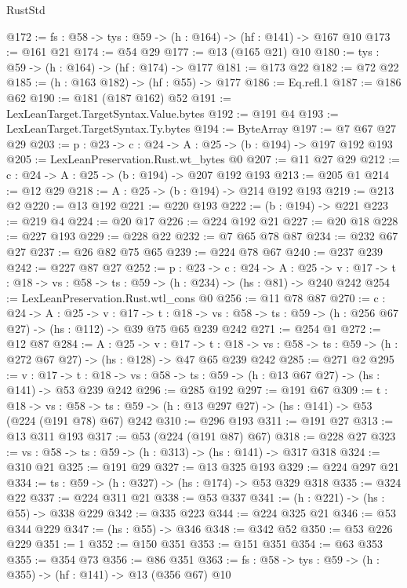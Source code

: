 \begin{lexlean}{RustStd}
\begin{coremodule}
@172 := {fs : @58} -> {tys : @59} -> (h : @164) -> (hf : @141) -> @167 @10
@173 := @161 @21
@174 := @54 @29
@177 := @13 (@165 @21) @10
@180 := {tys : @59} -> (h : @164) -> (hf : @174) -> @177
@181 := @173 @22
@182 := @72 @22
@185 := (h : @163 @182) -> (hf : @55) -> @177
@186 := Eq.refl.{1}
@187 := @186 @62
@190 := @181 (@187 @162) @52
@191 := LexLeanTarget.TargetSyntax.Value.bytes
@192 := @191 @4
@193 := LexLeanTarget.TargetSyntax.Ty.bytes
@194 := ByteArray
@197 := @7 @67 @27 @29
@203 := {p : @23} -> {c : @24} -> {A : @25} -> (b : @194) -> @197 @192 @193
@205 := LexLeanPreservation.Rust.wt_bytes @0
@207 := @11 @27 @29
@212 := {c : @24} -> {A : @25} -> (b : @194) -> @207 @192 @193
@213 := @205 @1
@214 := @12 @29
@218 := {A : @25} -> (b : @194) -> @214 @192 @193
@219 := @213 @2
@220 := @13 @192
@221 := @220 @193
@222 := (b : @194) -> @221
@223 := @219 @4
@224 := @20 @17
@226 := @224 @192 @21
@227 := @20 @18
@228 := @227 @193
@229 := @228 @22
@232 := @7 @65 @78 @87
@234 := @232 @67 @27
@237 := @26 @82 @75 @65
@239 := @224 @78 @67
@240 := @237 @239
@242 := @227 @87 @27
@252 := {p : @23} ->
  {c : @24} ->
  {A : @25} ->
  {v : @17} -> {t : @18} -> {vs : @58} -> {ts : @59} -> (h : @234) -> (hs : @81) -> @240 @242
@254 := LexLeanPreservation.Rust.wtl_cons @0
@256 := @11 @78 @87
@270 := {c : @24} ->
  {A : @25} ->
  {v : @17} ->
  {t : @18} ->
  {vs : @58} -> {ts : @59} -> (h : @256 @67 @27) -> (hs : @112) -> @39 @75 @65 @239 @242
@271 := @254 @1
@272 := @12 @87
@284 := {A : @25} ->
  {v : @17} ->
  {t : @18} -> {vs : @58} -> {ts : @59} -> (h : @272 @67 @27) -> (hs : @128) -> @47 @65 @239 @242
@285 := @271 @2
@295 := {v : @17} ->
  {t : @18} -> {vs : @58} -> {ts : @59} -> (h : @13 @67 @27) -> (hs : @141) -> @53 @239 @242
@296 := @285 @192
@297 := @191 @67
@309 := {t : @18} ->
  {vs : @58} -> {ts : @59} -> (h : @13 @297 @27) -> (hs : @141) -> @53 (@224 (@191 @78) @67) @242
@310 := @296 @193
@311 := @191 @27
@313 := @13 @311 @193
@317 := @53 (@224 (@191 @87) @67)
@318 := @228 @27
@323 := {vs : @58} -> {ts : @59} -> (h : @313) -> (hs : @141) -> @317 @318
@324 := @310 @21
@325 := @191 @29
@327 := @13 @325 @193
@329 := @224 @297 @21
@334 := {ts : @59} -> (h : @327) -> (hs : @174) -> @53 @329 @318
@335 := @324 @22
@337 := @224 @311 @21
@338 := @53 @337
@341 := (h : @221) -> (hs : @55) -> @338 @229
@342 := @335 @223
@344 := @224 @325 @21
@346 := @53 @344 @229
@347 := (hs : @55) -> @346
@348 := @342 @52
@350 := @53 @226 @229
@351 := 1
@352 := @150 @351
@353 := @151 @351
@354 := @63 @353
@355 := @354 @73
@356 := @86 @351
@363 := {fs : @58} -> {tys : @59} -> (h : @355) -> (hf : @141) -> @13 (@356 @67) @10

\end{coremodule}
\end{lexlean}
